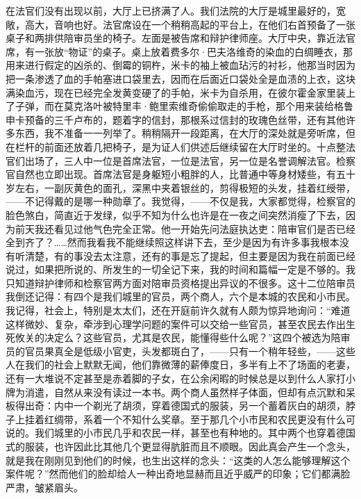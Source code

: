 \par 在法官们没有出现以前，大厅上已挤满了人。我们法院的大厅是城里最好的，宽敞，高大，音响也好。法官席设在一个稍稍高起的平台上，在他们右首预备了一张桌子和两排供陪审员坐的椅子。左面是被告席和辩护律师座。大厅中央，靠近法官席，有一张放“物证”的桌子。桌上放着费多尔·巴夫洛维奇的染血的白绸睡衣，那用来进行假定的凶杀的、倒霉的铜杵，米卡的袖上被血玷污的衬衫，他那当时因为把一条渗透了血的手帕塞进口袋里去，因而在后面近口袋处全是血渍的上衣，这块满染血污，现在已经完全发黄变硬了的手帕，米卡为自杀用，在彼尔霍金家里装上了子弹，而在莫克洛叶被特里丰·鲍里索维奇偷偷取走的手枪，那个用来装给格鲁申卡预备的三千卢布的，题着字的信封，那根系过信封的玫瑰色丝带，还有其他许多东西，我不准备一一列举了。稍稍隔开一段距离，在大厅的深处就是旁听席，但在栏杆的前面还放着几把椅子，是为证人们供述后继续留在大厅时坐的。十点整法官们出场了，三人中一位是首席法官，一位是法官，另一位是名誉调解法官。检察官自然也立即出现。首席法官是身躯短小粗胖的人，比普通中等身材矮些，有五十岁左右，一副灰黄色的面孔，深黑中夹着银丝的，剪得极短的头发，挂着红绶带，——不记得戴的是哪一种勋章了。我觉得，——不仅是我，大家都觉得，检察官的脸色煞白，简直近于发绿，似乎不知为什么也许是在一夜之间突然消瘦了下去，因为前天我还看见过他气色完全正常。他一开始先问法庭执达吏：陪审官们是否已经全到齐了？……然而我看我不能继续照这样讲下去，至少是因为有许多事我根本没有听清楚，有的事没去太注意，还有的事是忘了提起，但主要是因为我在前面已经说过，如果把所说的、所发生的一切全记下来，我的时间和篇幅一定是不够的。我只知道辩护律师和检察官两方面对陪审员资格提出异议的不很多。这十二位陪审员我倒还记得：有四个是我们城里的官员，两个商人，六个是本城的农民和小市民。我记得，社会上，特别是太太们，还在开庭前许久就有人颇为惊异地询问：“难道这样微妙、复杂，牵涉到心理学问题的案件可以交给一些官员，甚至农民去作出生死攸关的决定么？这些官员，尤其是农民，能懂得些什么呢？”这四个被选为陪审员的官员果真全是低级小官吏，头发都斑白了，——只有一个稍年轻些，——这些人在我们的社会上默默无闻，他们靠微薄的薪俸度日，多半有上不了场面的老妻，还有一大堆说不定甚至是赤着脚的子女，在公余闲暇的时候总是以到什么人家打小牌为消遣，自然从来没有读过一本书。两个商人虽然样子体面，但却有点沉默和呆板得出奇：内中一个剃光了胡须，穿着德国式的服装，另一个蓄着灰白的胡须，脖子上挂着红绸带，系着一个不知什么奖章。至于那几个小市民和农民更没有什么可说的。我们城里的小市民几乎和农民一样，甚至也有种地的。其中两个也穿着德国式的服装，也许因此比其他几个更显得肮脏而且不顺眼。因此真会产生一个念头，就是我在刚刚见到他们的时候，也生出这样的念头：“这类的人怎么能够理解这个案件呢？”然而他们的脸却给人一种出奇地显赫而且近乎威严的印象；它们都满脸严肃，皱紧眉头。
